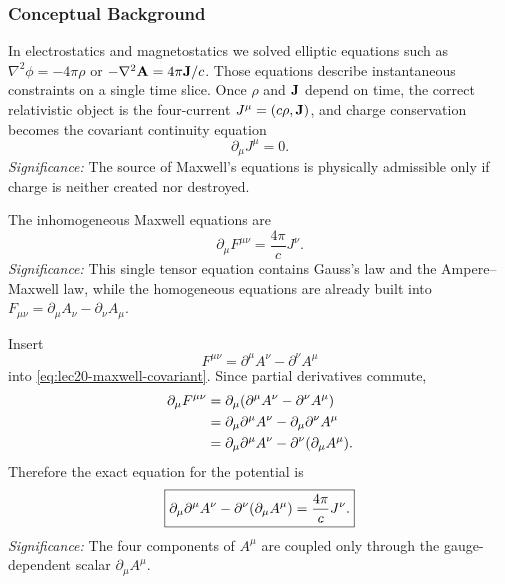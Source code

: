 \subsubsection*{Conceptual Background}
In electrostatics and magnetostatics we solved elliptic equations such as
$\nabla^2\phi=-4\pi\rho$ or $-\nabla^2\mathbf{A}=4\pi\mathbf{J}/c$. Those equations describe
instantaneous constraints on a single time slice. Once $\rho$ and $\mathbf{J}$ depend on time,
the correct relativistic object is the four-current $J^\mu=(c\rho,\mathbf{J})$, and charge
conservation becomes the covariant continuity equation
\begin{equation}\label{eq:lec20-continuity}
  \boxed{\partial_\mu J^\mu=0.}
\end{equation}
\textit{Significance:} The source of Maxwell's equations is physically admissible only if
charge is neither created nor destroyed.

The inhomogeneous Maxwell equations are
\begin{equation}\label{eq:lec20-maxwell-covariant}
  \boxed{\partial_\mu F^{\mu\nu}=\frac{4\pi}{c}J^\nu.}
\end{equation}
\textit{Significance:} This single tensor equation contains Gauss's law and the
Ampere--Maxwell law, while the homogeneous equations are already built into
$F_{\mu\nu}=\partial_\mu A_\nu-\partial_\nu A_\mu$.

Insert
\begin{equation}\label{eq:lec20-F-from-A}
  F^{\mu\nu}=\partial^\mu A^\nu-\partial^\nu A^\mu
\end{equation}
into \eqref{eq:lec20-maxwell-covariant}. Since partial derivatives commute,
\begin{align*}
  \partial_\mu F^{\mu\nu}
  &=\partial_\mu\qty(\partial^\mu A^\nu-\partial^\nu A^\mu) \\
  &=\partial_\mu\partial^\mu A^\nu-\partial_\mu\partial^\nu A^\mu \\
  &=\partial_\mu\partial^\mu A^\nu-\partial^\nu\qty(\partial_\mu A^\mu).
\end{align*}
Therefore the exact equation for the potential is
\begin{equation}\label{eq:lec20-A-before-gauge}
  \boxed{\partial_\mu\partial^\mu A^\nu
  -\partial^\nu\qty(\partial_\mu A^\mu)=\frac{4\pi}{c}J^\nu.}
\end{equation}
\textit{Significance:} The four components of $A^\mu$ are coupled only through the gauge-dependent scalar $\partial_\mu A^\mu$.

